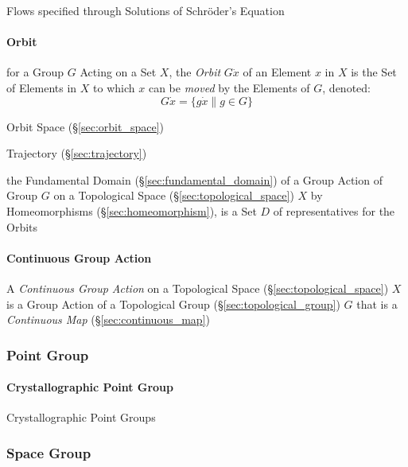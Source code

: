 \begin{itemize}
Flows specified through Solutions of Schr\"oder's Equation




\paragraph{Orbit}\label{sec:orbit}\hfill

for a Group $G$ Acting on a Set $X$, the \emph{Orbit} $G \dot x$ of an Element
$x$ in $X$ is the Set of Elements in $X$ to which $x$ can be \emph{moved} by
the Elements of $G$, denoted:
\[
  G \dot x = \{ g \dot x \| g \in G \}
\]

\fist Orbit Space (\S\ref{sec:orbit_space})

\fist Trajectory (\S\ref{sec:trajectory})

the Fundamental Domain (\S\ref{sec:fundamental_domain}) of a Group Action of
Group $G$ on a Topological Space (\S\ref{sec:topological_space}) $X$ by
Homeomorphisms (\S\ref{sec:homeomorphism}), is a Set $D$ of representatives for
the Orbits



\paragraph{Continuous Group Action}\label{sec:continuous_group_action}

A \emph{Continuous Group Action} on a Topological Space
(\S\ref{sec:topological_space}) $X$ is a Group Action of a Topological Group
(\S\ref{sec:topological_group}) $G$ that is a \emph{Continuous Map}
(\S\ref{sec:continuous_map})



\subsubsection{Point Group}\label{sec:point_group}

\paragraph{Crystallographic Point Group}\label{sec:crystallographic_point_group}
\hfill

Crystallographic Point Groups



\subsubsection{Space Group}\label{sec:space_group}


\end{itemize}
